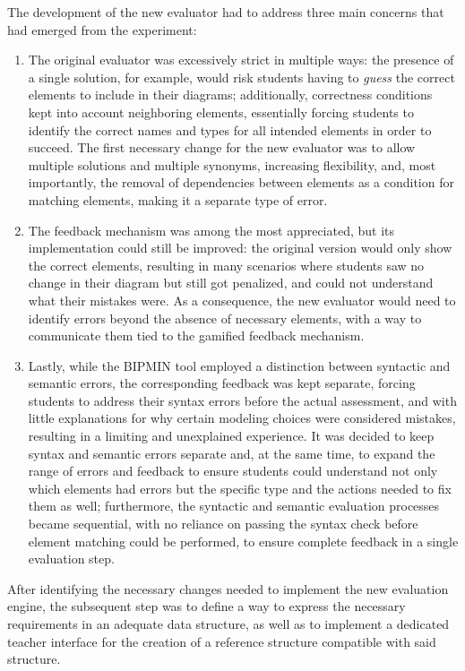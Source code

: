 The development of the new evaluator had to address three main concerns that had emerged from the experiment:
\begin{enumerate}
    \item The original evaluator was excessively strict in multiple ways: the presence of a single solution, for example, would risk students having to \textit{guess} the correct elements to include in their diagrams; additionally, correctness conditions kept into account neighboring elements, essentially forcing students to identify the correct names and types for all intended elements in order to succeed. The first necessary change for the new evaluator was to allow multiple solutions and multiple synonyms, increasing flexibility, and, most importantly, the removal of dependencies between elements as a condition for matching elements, making it a separate type of error.
    \item The feedback mechanism was among the most appreciated, but its implementation could still be improved: the original version would only show the correct elements, resulting in many scenarios where students saw no change in their diagram but still got penalized, and could not understand what their mistakes were. As a consequence, the new evaluator would need to identify errors beyond the absence of necessary elements, with a way to communicate them tied to the gamified feedback mechanism.
    \item Lastly, while the BIPMIN tool employed a distinction between syntactic and semantic errors, the corresponding feedback was kept separate, forcing students to address their syntax errors before the actual assessment, and with little explanations for why certain modeling choices were considered mistakes, resulting in a limiting and unexplained experience. It was decided to keep syntax and semantic errors separate and, at the same time, to expand the range of errors and feedback to ensure students could understand not only which elements had errors but the specific type and the actions needed to fix them as well; furthermore, the syntactic and semantic evaluation processes became sequential, with no reliance on passing the syntax check before element matching could be performed, to ensure complete feedback in a single evaluation step.  
\end{enumerate}

After identifying the necessary changes needed to implement the new evaluation engine, the subsequent step was to define a way to express the necessary requirements in an adequate data structure, as well as to implement a dedicated teacher interface for the creation of a reference structure compatible with said structure.

